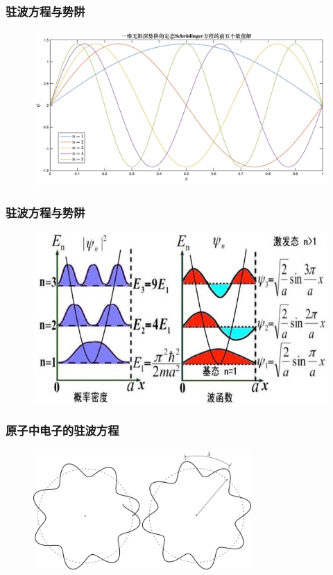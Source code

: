 {\frame
{
	\frametitle{驻波方程与势阱}
\begin{figure}[h!]
\centering
\vspace{-5.5pt}
\includegraphics[height=0.55\textwidth,width=1.0\textwidth,viewport=0 0 720 400,clip]{Figures/Standing_wave-energy_1-5.jpg}
\label{Standing_Wave_2}
\end{figure}
}

\frame
{
	\frametitle{驻波方程与势阱}
\begin{figure}[h!]
\centering
\vspace{-0.5pt}
\includegraphics[height=0.46\textwidth,width=1.0\textwidth,viewport=0 0 650 390,clip]{Figures/Standing_wave_Energy.jpeg}
\label{Standing_Wave_3}
\end{figure}
}

\frame
{
	\frametitle{原子中电子的驻波方程}
\begin{figure}[h!]
	\vspace{-10.5pt}
\centering
\includegraphics[height=0.38\textwidth,width=0.74\textwidth,viewport=0 0 840 440,clip]{Figures/Standing_wave-atom.png}
\vskip 2pt
\label{Atomic-electron_Standing_wave}
\end{figure}
}

}
